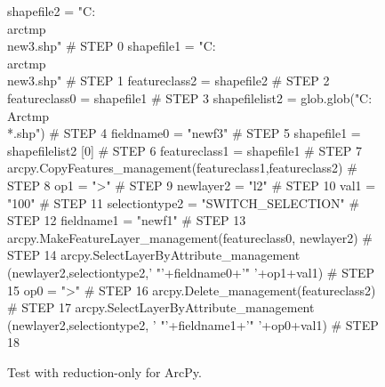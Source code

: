 \begin{figure}[t]
{\scriptsize 
\begin{code}
shapefile2 = "C:\\arctmp\\new3.shp"                               \# STEP 0 
shapefile1 = "C:\\arctmp\\new3.shp"                               \# STEP 1
featureclass2 = shapefile2                                      \# STEP 2
featureclass0 = shapefile1                                      \# STEP 3
shapefilelist2 = glob.glob("C:\\Arctmp\\*.shp")                   \# STEP 4
fieldname0 = "newf3"                                            \# STEP 5
shapefile1 = shapefilelist2 [0]                                 \# STEP 6
featureclass1 = shapefile1                                      \# STEP 7
arcpy.CopyFeatures\_management(featureclass1,featureclass2)     \# STEP 8
op1 = ">"                                                       \# STEP 9
newlayer2 = "l2"                                                  \# STEP 10
val1 = "100"                                                      \# STEP 11
selectiontype2 = "SWITCH\_SELECTION"                               \# STEP 12
fieldname1 = "newf1"                                              \# STEP 13
arcpy.MakeFeatureLayer\_management(featureclass0, newlayer2)   \# STEP 14
arcpy.SelectLayerByAttribute\_management
   (newlayer2,selectiontype2,' "'+fieldname0+'" '+op1+val1)   \# STEP 15
op0 = ">"                                                        \# STEP 16
arcpy.Delete\_management(featureclass2)                           \# STEP 17
arcpy.SelectLayerByAttribute\_management
   (newlayer2,selectiontype2, ' "'+fieldname1+'" '+op0+val1) \# STEP 18
\end{code}
}
\caption{Test with reduction-only for ArcPy.}
\vspace{-0.15in}
\label{esriorig}
\end{figure}

